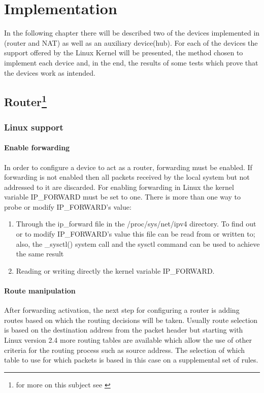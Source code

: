 \chapter{Implementation}
\label{chapter:impl}
In the following chapter there will be described two of the devices implemented in \project(router and NAT) as well as an auxiliary device(hub). For each of the devices the support offered by the Linux Kernel will be presented, the method chosen to implement each device and, in the end, the results of some tests which prove that the devices work as intended.

\section[Router]{Router\footnote{for more on this subject see \cite{linnetarch}}}
\label{sec:router-impl}

\subsection{Linux support}
\label{sub-sec:router-linux}

\subsubsection{Enable forwarding}
In order to configure a device to act as a router, forwarding must be enabled. If forwarding is not enabled then all packets received by the local system but not addressed to it are discarded. 
For enabling forwarding in Linux the kernel variable IP_FORWARD must be set to one. There is more than one way to probe or modify IP_FORWARD's value:
\renewcommand{\theenumi}{\alph{enumi}}
\begin{enumerate}
\item Through the ip_forward file in the /proc/sys/net/ipv4 directory. To find out or to modify IP_FORWARD's value this file can be read from or written to; also, the _sysctl() system call and the sysctl command can be used to achieve the same result 
\item Reading or writing directly the kernel variable IP_FORWARD. 
\end{enumerate}
\renewcommand{\theenumi}{\arabic{enumi}}

\subsubsection{Route manipulation}
After forwarding activation, the next step for configuring a router is adding routes based on which the routing decisions will be taken. Usually route selection is based on the destination address from the packet header but starting with Linux version 2.4 more routing tables are available which allow the use of other criteria for the routing process such as source address. The selection of which table to use for which packets is based in this case on a supplemental set of rules.

